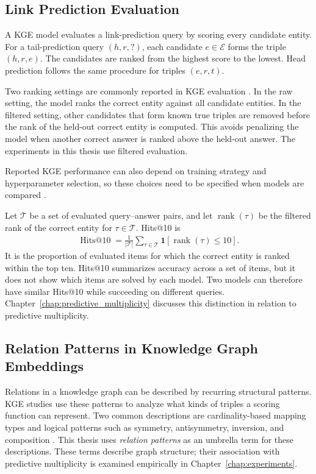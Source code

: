 \subsection{Link Prediction Evaluation}

A KGE model evaluates a link-prediction query by scoring every candidate
entity. For a tail-prediction query $(h,r,?)$, each candidate $e\in\mathcal{E}$
forms the triple $(h,r,e)$. The candidates are ranked from the highest score to
the lowest. Head prediction follows the same procedure for triples $(e,r,t)$.

Two ranking settings are commonly reported in KGE evaluation
\citep{bordes2013translating}. In the raw setting, the model ranks the correct
entity against all candidate entities. In the filtered setting, other
candidates that form known true triples are removed before the rank of the
held-out correct entity is computed. This avoids penalizing the model when
another correct answer is ranked above the held-out answer. The experiments in
this thesis use filtered evaluation.

Reported KGE performance can also depend on training strategy and
hyperparameter selection, so these choices need to be specified when models
are compared \citep{ruffinelli2020teach,rossi2021comparative}.

Let $\mathcal{T}$ be a set of evaluated query--answer pairs, and let
$\operatorname{rank}(\tau)$ be the filtered rank of the correct entity for
$\tau\in\mathcal{T}$. Hits@10 is
\begin{align}
    \operatorname{Hits@10}
    =
    \frac{1}{|\mathcal{T}|}
    \sum_{\tau\in\mathcal{T}}
    \mathbf{1}\!\left[\operatorname{rank}(\tau)\leq 10\right].
\end{align}
It is the proportion of evaluated items for which the correct entity is ranked
within the top ten. Hits@10 summarizes accuracy across a set of items, but it
does not show which items are solved by each model. Two models can therefore
have similar Hits@10 while succeeding on different queries.
Chapter~\ref{chap:predictive_multiplicity} discusses this distinction in
relation to predictive multiplicity.

\subsection{Relation Patterns in Knowledge Graph Embeddings}

Relations in a knowledge graph can be described by recurring structural
patterns. KGE studies use these patterns to analyze what kinds of triples a
scoring function can represent. Two common descriptions are cardinality-based
mapping types and logical patterns such as symmetry, antisymmetry, inversion,
and composition \citep{bordes2013translating,sun2019rotate,zhu2024rotation}.
This thesis uses \emph{relation patterns} as an umbrella term for these
descriptions. These terms describe graph structure; their association with
predictive multiplicity is examined empirically in
Chapter~\ref{chap:experiments}.

